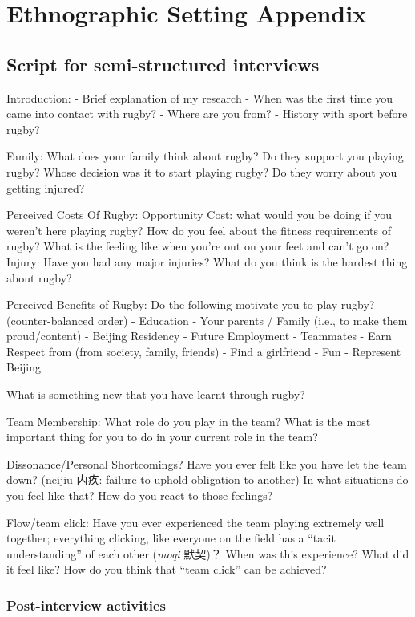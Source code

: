 
\chapter{\label{app4:ethnoSetting}Ethnographic Setting Appendix}


\section{Script for semi-structured interviews \label{sect:semiStructured}}

Introduction:
- Brief explanation of my research
- When was the first time you came into contact with rugby?
- Where are you from?
- History with sport before rugby?

Family:
What does your family think about rugby?
Do they support you playing rugby?
Whose decision was it to start playing rugby?
Do they worry about you getting injured?

Perceived Costs Of Rugby:
Opportunity Cost: what would you be doing if you weren’t here playing rugby?
How do you feel about the fitness requirements of rugby?
What is the feeling like when you’re out on your feet and can’t go on?
Injury: Have you had any major injuries?
What do you think is the hardest thing about rugby?

Perceived Benefits of Rugby:
Do the following motivate you to play rugby? (counter-balanced order)
- Education
- Your parents / Family (i.e., to make them proud/content)
- Beijing Residency
- Future Employment
- Teammates
- Earn Respect from (from society, family, friends)
- Find a girlfriend
- Fun
- Represent Beijing

What is something new that you have learnt through rugby?

Team Membership:
What role do you play in the team?
What is the most important thing for you to do in your current role in the team?

Dissonance/Personal Shortcomings?
Have you ever felt like you have let the team down?  (neijiu 内疚: failure to uphold obligation to another)
In what situations do you feel like that?
How do you react to those feelings?

Flow/team click:
Have you ever experienced the team playing extremely well together; everything clicking, like everyone on the field has a “tacit understanding” of each other (\textit{moqi} 默契)？
When was this experience?
What did it feel like?
How do you think that “team click” can be achieved?


\subsection{Post-interview activities\label{sect:postInterview}}


